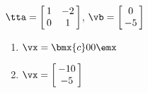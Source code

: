 {$\tta = \left[\hskip -3pt \begin{array}{cc} 1&-2\\  0&1\end {array} \hskip -3pt
 \right]$, $\vb=\left[\hskip -3pt \begin{array}{c} 0\\  -5\end{array}\hskip -3pt \right]$}
{\begin{enumerate}
\item	 $\vx=\bmx{c}0\\0\emx$
\item	 $\vx=\left[\hskip -3pt \begin{array}{c} -10\\  -5\end {array} \hskip -3pt
\right]$
\end{enumerate}
 }







